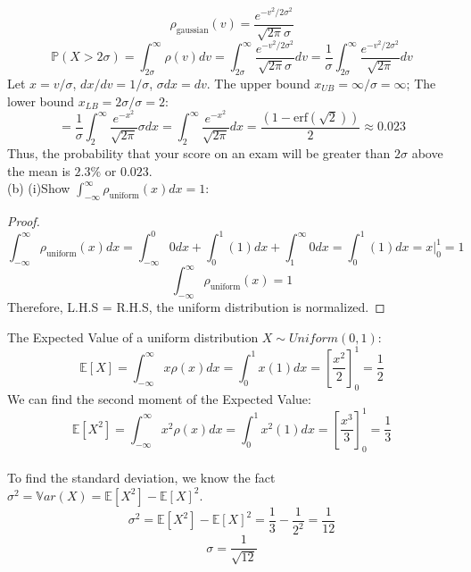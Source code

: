 \documentclass[11pt]{article}
\def\mbb{\mathbb}
\def\E{\mbb{E}}
\def\P{\mbb{P}}
\theoremstyle{pink}
\theoremstyle{boxedsolution}
\theoremstyle{definition}
\theoremstyle{claim}
\begin{document}
 \newpage
  \begin{center}
 \end{center}
 \[\rho_{\text{gaussian}}(v)=\frac{e^{-v^2/2\sigma^2}}{\sqrt{2\pi}\sigma}\]
 \vspace{3mm}
 \[\P(X>2\sigma)=\int^\infty_{2\sigma}\rho(v)dv=\int^{\infty}_{2\sigma}\frac{e^{-v^2/2\sigma^2}}{\sqrt{2\pi}\sigma}dv=\frac{1}{\sigma}\int^{\infty}_{2\sigma}\frac{e^{-v^2/2\sigma^2}}{\sqrt{2\pi}}dv\]
 Let $x=v/\sigma$, $dx/dv=1/\sigma$, $\sigma dx= dv$. The upper bound $x_{UB}=\infty/\sigma=\infty$; The lower bound $x_{LB}=2\sigma/\sigma=2$:
 \[=\frac{1}{\sigma}\int^{\infty}_{2}\frac{e^{-x^2}}{\sqrt{2\pi}}\sigma dx= \int^{\infty}_{2}\frac{e^{-x^2}}{\sqrt{2\pi}} dx=\frac{(1-\text{erf}(\sqrt{2}))}{2} \approx 0.023\]
 Thus, the probability that your score on an exam will be greater than $2\sigma$ above the mean is $2.3\%$ or $0.023$.
 \vspace{5mm}
 \\(b)
 (i)Show $\int^\infty_{-\infty}\rho_{\text{uniform}}(x)dx=1$:
 \begin{proof}
 \[\int^\infty_{-\infty}\rho_{\text{uniform}}(x)dx=\int^0_{-\infty}0dx+\int^1_0 (1)dx+\int^\infty_{1}0dx=\int^1_0 (1)dx=x|^1_0=1\]
 \[\int^\infty_{-\infty}\rho_{\text{uniform}}(x)=1\]
 Therefore, L.H.S = R.H.S, the uniform distribution is normalized.
 \end{proof}
The Expected Value of a uniform distribution $X \sim Uniform(0,1)$:
\[\E[X]=\int^\infty_{-\infty}x\rho(x)dx=\int^1_0x(1)dx=\left[\frac{x^2}{2}\right]^1_0=\frac{1}{2}\]
We can find the second moment of the Expected Value:
\[\E[X^2]=\int^\infty_{-\infty}x^2\rho(x)dx=\int^1_0x^2(1)dx=\left[\frac{x^3}{3}\right]^1_0=\frac{1}{3}\]
\vspace{2mm}
\\To find the standard deviation, we know the fact $\sigma^2=\mathbb{V}ar(X)=\E[X^2]-\E[X]^2$. 
\[\sigma^2=\E[X^2]-\E[X]^2=\frac{1}{3}-\frac{1}{2^2}=\frac{1}{12}\]
\[\sigma = \frac{1}{\sqrt{12}}\]
\end{document}
